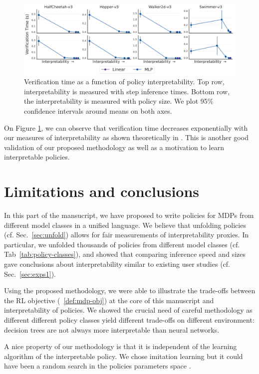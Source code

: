 \begin{figure}[ht]
    \centering
    \includegraphics[width=1\linewidth]{images/images_part3/verification_tradeoff.pdf}
    \caption{Verification time as a function of policy interpretability. Top row, interpretability is measured with step inference times. Bottom row, the interpretability is measured with policy size. We plot 95\% confidence intervals around means on both axes.}
    \label{fig:trade-off-verif}
\end{figure}

On Figure \ref{fig:trade-off-verif}, we can observe that verification time decreases exponentially with our measures of interpretability as shown theoretically in \cite{lens-complexity}.
This is another good validation of our proposed methodology as well as a motivation to learn interpretable policies. 

\section{Limitations and conclusions}\label{sec:ccl}
In this part of the mansucript, we have proposed to write policies for MDPs from different model classes in a unified language.
We believe that unfolding policies (cf. Sec.~\ref{sec:unfold}) allows for fair measurements of interpretability proxies.
In particular, we unfolded thousands of policies from different model classes (cf. Tab~\ref{tab:policy-classes}), and showed that comparing inference speed and sizes gave conclusions about interpretability similar to existing user studies (cf. Sec.~\ref{sec:exps1}).

Using the proposed methodology, we were able to illustrate the trade-offs between the RL objective (~\ref{def:mdp-obj}) at the core of this manuscript and interpretability of policies.
We showed the crucial need of careful methodology as different different policy classes yield different trade-offs on different environment: decision trees are not always more interpretable than neural networks. 

A nice property of our methodology is that it is independent of the learning algorithm of the interpretable policy.
We chose imitation learning but it could have been a random search in the policies parameters space \cite{empirical-evidence}.

